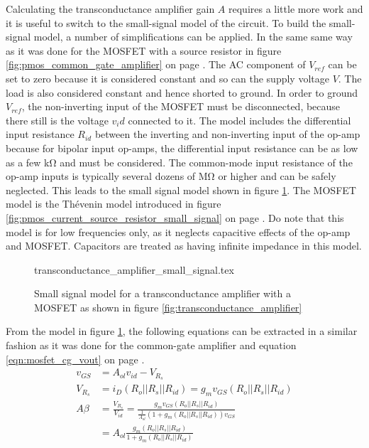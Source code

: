 \documentclass[12pt]{book}
\begin{document}
Calculating the transconductance amplifier gain $A$ requires a little more work and it is useful to switch to the small-signal model of the circuit. To build the small-signal model, a number of simplifications can be applied. In the same same way as it was done for the MOSFET with a source resistor in figure \ref{fig:pmos_common_gate_amplifier} on page \pageref{fig:pmos_common_gate_amplifier}. The AC component of $V_{ref}$ can be set to zero because it is considered constant and so can the supply voltage $V$. The load is also considered constant and hence shorted to ground. In order to ground $V_{ref}$, the non-inverting input of the MOSFET must be disconnected, because there still is the voltage $v_id$ connected to it. The model includes the differential input resistance $R_{id}$ between the inverting and non-inverting input of the op-amp because for bipolar input op-amps, the differential input resistance can be as low as a few \unit{\kilo\ohm} and must be considered. The common-mode input resistance of the op-amp inputs is typically several dozens of \unit{\mega \ohm} or higher and can be safely neglected. This leads to the small signal model shown in figure \ref{fig:transconductance_amplifier_small_signal}. The MOSFET model is the Thévenin model introduced in figure \ref{fig:pmos_current_source_resistor_small_signal} on page \pageref{fig:pmos_current_source_resistor_small_signal}. Do note that this model is for low frequencies only, as it neglects capacitive effects of the op-amp and MOSFET. Capacitors are treated as having infinite impedance in this model.

\begin{figure}[hb]
    \centering
        {transconductance_amplifier_small_signal.tex}
    \caption{Small signal model for a transconductance amplifier with a MOSFET as shown in figure \ref{fig:transconductance_amplifier}}
    \label{fig:transconductance_amplifier_small_signal}
\end{figure}

From the model in figure \ref{fig:transconductance_amplifier_small_signal}, the following equations can be extracted in a similar fashion as it was done for the common-gate amplifier and equation \ref{eqn:mosfet_cg_vout} on page \pageref{eqn:mosfet_cg_vout}.
\begin{align}
    v_{GS} &= A_{ol} v_{id} - V_{R_s}\\
    V_{R_s} &= i_D \left(R_o || R_s || R_{id}\right) = g_m v_{GS} \left(R_o || R_s || R_{id}\right)\\
    A\beta &= \frac{V_{R_s}}{V_{id}} = \frac{g_m v_{GS} \left(R_o || R_s || R_{id}\right)}{\frac{1}{A_{ol}} \left(1 + g_m \left(R_o || R_s || R_{id}\right)\right) v_{GS}} \nonumber\\
    &= A_{ol} \frac{g_m \left(R_o || R_s || R_{id}\right)}{1 + g_m \left(R_o || R_s || R_{id}\right)}
\end{align}
\end{document}
